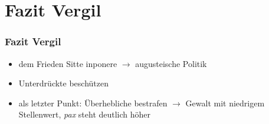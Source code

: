 \section{Fazit Vergil}
\begin{frame}
	\frametitle{Fazit Vergil}
	\begin{itemize}
		\item<3-> dem Frieden Sitte \glqq inponere \grqq $\to$ augusteische Politik
		\item<4-> Unterdrückte beschützen
		\item<5-> als letzter Punkt: Überhebliche bestrafen $\to$ Gewalt mit niedrigem Stellenwert, \textit{pax} steht deutlich höher
	\end{itemize}
\end{frame}